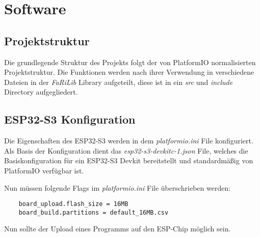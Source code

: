 \chapter{Software}

    \section{Projektstruktur}
    Die grundlegende Struktur des Projekts folgt der von PlatformIO 
    normalisierten Projektstruktur. Die Funktionen werden nach ihrer
    Verwendung in verschiedene Dateien in der \textit{FaRiLib} Library
    aufgeteilt, diese ist in ein \textit{src} und \textit{include} 
    Directory aufgegliedert.

    \section{ESP32-S3 Konfiguration}
    Die Eigenschaften des ESP32-S3 werden in dem \textit{platformio.ini}
    File konfiguriert. Als Basis der Konfiguration dient
    das \textit{esp32-s3-devkitc-1.json} File, welches die
    Basiskonfiguration für ein ESP32-S3 Devkit bereitstellt
    und standardmäßig von PlatformIO verfügbar ist. \par
    
    Nun müssen folgende Flags im \textit{platformio.ini} File
    überschrieben werden:

    \begin{lstlisting}
    board_upload.flash_size = 16MB
    board_build.partitions = default_16MB.csv
    \end{lstlisting}

    Nun sollte der Upload eines Programms auf den 
    ESP-Chip möglich sein.

    
    



